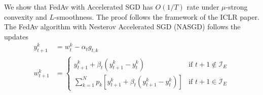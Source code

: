 


We show that FedAv with Accelerated SGD has $O(1/T)$ rate under $\mu$-strong
convexity and $L$-smoothness. The proof follows the framework of
the ICLR paper. The FedAv algorithm with Nesterov Accelerated SGD
(NASGD) follows the updates
\begin{align*}
y_{t+1}^{k} & =w_{t}^{k}-\alpha_{t}g_{t,k}\\
w_{t+1}^{k} & =\begin{cases}
y_{t+1}^{k}+\beta_{t}(y_{t+1}^{k}-y_{t}^{k}) & \text{if }t+1\notin\mathcal{I}_{E}\\
\sum_{k=1}^{N}p_{k}\left[y_{t+1}^{k}+\beta_{t}(y_{t+1}^{k}-y_{t}^{k})\right] & \text{if }t+1\in\mathcal{I}_{E}
\end{cases}
\end{align*}


